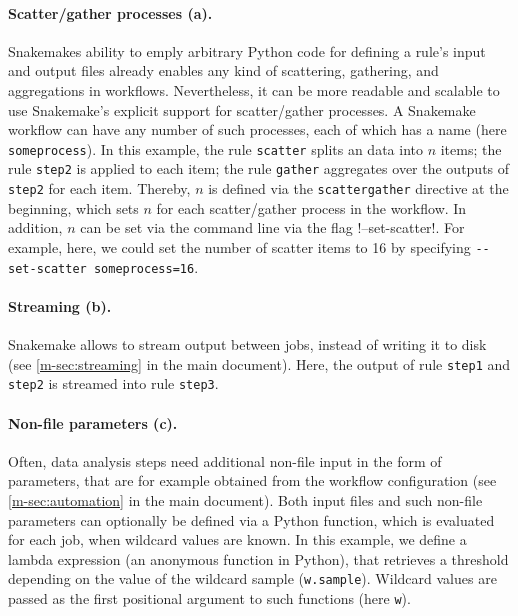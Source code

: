 \documentclass{scrartcl}
\begin{document}
\paragraph{Scatter/gather processes (a).} Snakemakes ability to emply arbitrary Python code for defining a rule's input and output files already enables any kind of scattering, gathering, and aggregations in workflows. Nevertheless, it can be more readable and scalable to use Snakemake's explicit support for scatter/gather processes. 
A Snakemake workflow can have any number of such processes, each of which has a name (here \lstinline!someprocess!).
In this example, the rule \lstinline!scatter! splits an data into $n$ items; the rule \lstinline!step2! is applied to each item; the rule \lstinline!gather! aggregates over the outputs of \lstinline!step2! for each item.
Thereby, $n$ is defined via the \lstinline!scattergather! directive at the beginning, which sets $n$ for each scatter/gather process in the workflow.
In addition, $n$ can be set via the command line via the flag \lstlinline!--set-scatter!.
For example, here, we could set the number of scatter items to 16 by specifying \lstinline!--set-scatter someprocess=16!.

\paragraph{Streaming (b).} Snakemake allows to stream output between jobs, instead of writing it to disk (see \autoref{m-sec:streaming} in the main document). Here, the output of rule \lstinline!step1! and \lstinline!step2! is streamed into rule \lstinline!step3!.

\paragraph{Non-file parameters (c).} Often, data analysis steps need additional non-file input in the form of parameters, that are for example obtained from the workflow configuration (see \autoref{m-sec:automation} in the main document). Both input files and such non-file parameters can optionally be defined via a Python function, which is evaluated for each job, when wildcard values are known. 
In this example, we define a lambda expression (an anonymous function in Python), that retrieves a threshold depending on the value of the wildcard sample (\lstinline!w.sample!).
Wildcard values are passed as the first positional argument to such functions (here \lstinline!w!).
\end{document}
